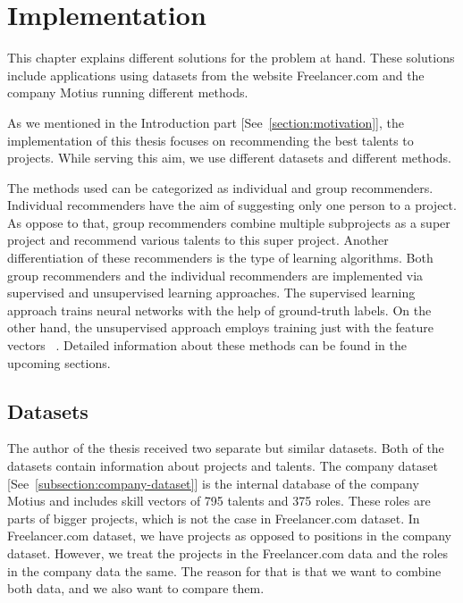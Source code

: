 
\chapter{Implementation}\label{chapter:implementation}

This chapter explains different solutions for the problem at hand. These solutions include applications using datasets from the website Freelancer.com and the company Motius running different methods.

As we mentioned in the Introduction part [See~\autoref{section:motivation}], the implementation of this thesis focuses on recommending the best talents to projects. While serving this aim, we use different datasets and different methods. 


The methods used can be categorized as individual and group recommenders. Individual recommenders have the aim of suggesting only one person to a project. As oppose to that, group recommenders combine multiple subprojects as a super project and recommend various talents to this super project. Another differentiation of these recommenders is the type of learning algorithms. Both group recommenders and the individual recommenders are implemented via supervised and unsupervised learning approaches. The supervised learning approach trains neural networks with the help of ground-truth labels. On the other hand, the unsupervised approach employs training just with the feature vectors ~\parencite{sathya2013comparison}. Detailed information about these methods can be found in the upcoming sections. 

\section{Datasets}\label{section:datasets}

The author of the thesis received two separate but similar datasets. Both of the datasets contain information about projects and talents. The company dataset [See~\autoref{subsection:company-dataset}] is the internal database of the company Motius and includes skill vectors of 795 talents and 375 roles. These roles are parts of bigger projects, which is not the case in Freelancer.com dataset. In Freelancer.com dataset, we have projects as opposed to positions in the company dataset. However, we treat the projects in the Freelancer.com data and the roles in the company data the same. The reason for that is that we want to combine both data, and we also want to compare them.



